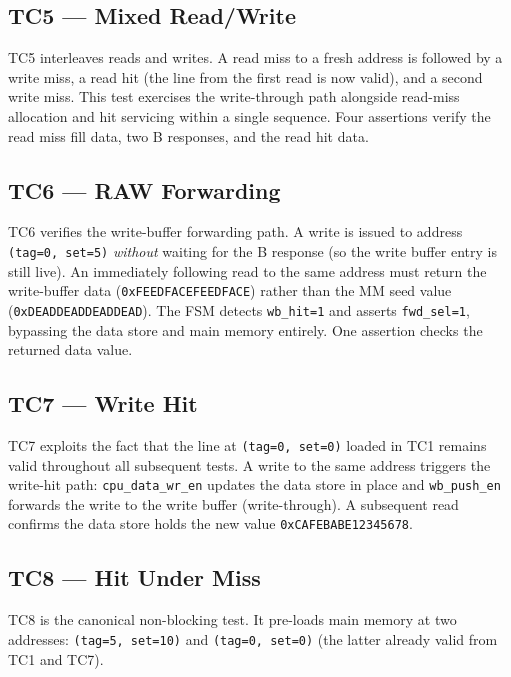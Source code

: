 \documentclass[12pt,letterpaper]{report}
\begin{document}
\subsection{TC5 — Mixed Read/Write}

TC5 interleaves reads and writes.  A read miss to a fresh address is
followed by a write miss, a read hit (the line from the first read is
now valid), and a second write miss.  This test exercises the
write-through path alongside read-miss allocation and hit servicing
within a single sequence.  Four assertions verify the read miss fill
data, two B responses, and the read hit data.

\subsection{TC6 — RAW Forwarding}

TC6 verifies the write-buffer forwarding path.  A write is issued to
address \texttt{(tag=0, set=5)} \emph{without} waiting for the B
response (so the write buffer entry is still live).  An immediately
following read to the same address must return the write-buffer data
(\texttt{0xFEEDFACEFEEDFACE}) rather than the MM seed value
(\texttt{0xDEADDEADDEADDEAD}).  The FSM detects \texttt{wb\_hit=1}
and asserts \texttt{fwd\_sel=1}, bypassing the data store and main
memory entirely.  One assertion checks the returned data value.

\subsection{TC7 — Write Hit}

TC7 exploits the fact that the line at \texttt{(tag=0, set=0)} loaded
in TC1 remains valid throughout all subsequent tests.  A write to the
same address triggers the write-hit path: \texttt{cpu\_data\_wr\_en}
updates the data store in place and \texttt{wb\_push\_en} forwards the
write to the write buffer (write-through).  A subsequent read confirms
the data store holds the new value \texttt{0xCAFEBABE12345678}.

\subsection{TC8 — Hit Under Miss}
\label{sec:tc8}

TC8 is the canonical non-blocking test.  It pre-loads main memory
at two addresses: \texttt{(tag=5, set=10)} and \texttt{(tag=0, set=0)}
(the latter already valid from TC1 and TC7).
\end{document}

